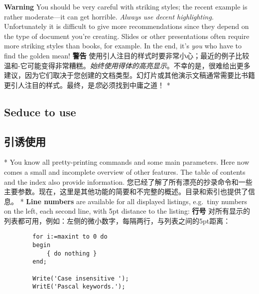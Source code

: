 \begin{paracol}{2}
\textbf{Warning}\label{wStrikingStyles}
You should be very careful with striking styles; the recent example is rather
moderate---it can get horrible. \emph{Always use decent highlighting.}
Unfortunately it is difficult to give more recommendations since they depend
on the type of document you're creating. Slides or other presentations often
require more striking styles than books, for example.
In the end, it's \emph{you} who have to find the golden mean!
\switchcolumn
\textbf{警告}\label{wStrikingStyles}
使用引人注目的样式时要非常小心；最近的例子比较温和-它可能变得非常糟糕。\emph{始终使用得体的高亮显示}。不幸的是，很难给出更多建议，因为它们取决于您创建的文档类型。幻灯片或其他演示文稿通常需要比书籍更引人注目的样式。最终，是\emph{您}必须找到中庸之道！
\switchcolumn[0]*%
\subsection{Seduce to use}\label{gSeduceToUse}
\switchcolumn
\subsection{引诱使用}
\switchcolumn[0]*%
You know all pretty-printing commands and some main parameters. Here now
comes a small and incomplete overview of other features. The table of
contents and the index also provide information.
\switchcolumn
您已经了解了所有漂亮的抄录命令和一些主要参数。现在，这里是其他功能的简要和不完整的概述。目录和索引也提供了信息。
\switchcolumn[0]*%
\textbf{Line numbers}
are available for all displayed listings, e.g.~tiny numbers on the left, each
second line, with 5pt distance to the listing:
\switchcolumn
\textbf{行号}
对所有显示的列表都可用，例如：左侧的微小数字，每隔两行，与列表之间的5pt距离：
\begin{lstxsample}
        \lstset{numbers=left, numberstyle=\tiny, stepnumber=2, numbersep=5pt}
\end{lstxsample}
\begin{lstsample}{}{}
        \begin{lstlisting}
        for i:=maxint to 0 do
        begin
            { do nothing }
        end;

        Write('Case insensitive ');
        WritE('Pascal keywords.');
        \end{lstlisting}
\end{lstsample}
\end{paracol}


